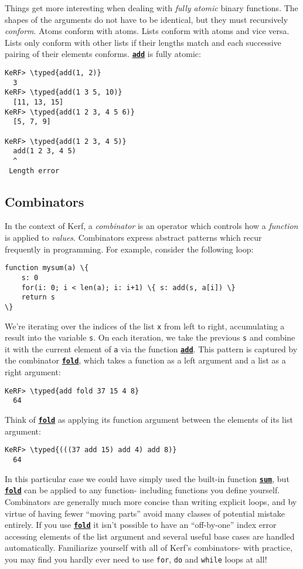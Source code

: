 \documentclass{article}
\newcommand{\typed}[1]{\textcolor{TealBlue}{#1}}
\newcommand{\primu}[2]{\hyperref[prim:#2]{\textbf{\texttt{#1}}}}
\newcommand{\prim}[1]{\primu{#1}{#1}}
\newcommand{\comb}[1]{\primu{#1}{#1}}
\begin{document}
Things get more interesting when dealing with \emph{fully atomic} binary functions. The shapes of the arguments do not have to be identical, but they must recursively \emph{conform}. Atoms conform with atoms. Lists conform with atoms and vice versa. Lists only conform with other lists if their lengths match and each successive pairing of their elements conforms. \prim{add} is fully atomic:

\begin{Verbatim}
KeRF> \typed{add(1, 2)}
  3
KeRF> \typed{add(1 3 5, 10)}
  [11, 13, 15]
KeRF> \typed{add(1 2 3, 4 5 6)}
  [5, 7, 9]

KeRF> \typed{add(1 2 3, 4 5)}
  add(1 2 3, 4 5)
  ^
 Length error
\end{Verbatim}

\pagebreak
\subsection{Combinators}
In the context of Kerf, a \emph{combinator} is an operator which controls how a \emph{function} is applied to \emph{values}. Combinators express abstract patterns which recur frequently in programming. For example, consider the following loop:

\begin{Verbatim}
function mysum(a) \{
	s: 0
	for(i: 0; i < len(a); i: i+1) \{ s: add(s, a[i]) \}
	return s
\}
\end{Verbatim}

We're iterating over the indices of the list \texttt{x} from left to right, accumulating a result into the variable \texttt{s}. On each iteration, we take the previous \texttt{s} and combine it with the current element of \texttt{a} via the function \prim{add}. This pattern is captured by the combinator \comb{fold}, which takes a function as a left argument and a list as a right argument:

\begin{Verbatim}
KeRF> \typed{add fold 37 15 4 8}
  64
\end{Verbatim}

Think of \comb{fold} as applying its function argument between the elements of its list argument:
\begin{Verbatim}
KeRF> \typed{(((37 add 15) add 4) add 8)}
  64
\end{Verbatim}

In this particular case we could have simply used the built-in function \prim{sum}, but \comb{fold} can be applied to any function- including functions you define yourself. Combinators are generally much more concise than writing explicit loops, and by virtue of having fewer ``moving parts'' avoid many classes of potential mistake entirely. If you use \comb{fold} it isn't possible to have an ``off-by-one'' index error accessing elements of the list argument and several useful base cases are handled automatically. Familiarize yourself with all of Kerf's combinators- with practice, you may find you hardly ever need to use \texttt{for}, \texttt{do} and \texttt{while} loops at all!
\end{document}
